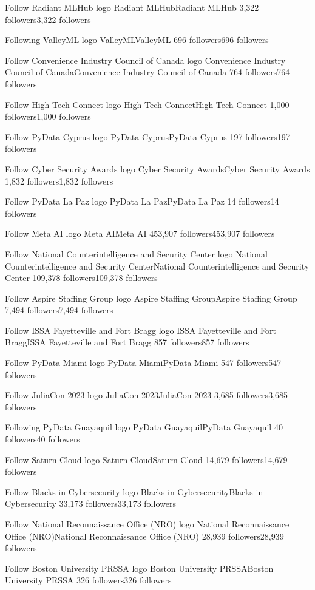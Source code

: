 Follow
Radiant MLHub logo
Radiant MLHubRadiant MLHub
3,322 followers3,322 followers

Following
ValleyML logo
ValleyMLValleyML
696 followers696 followers

Follow
Convenience Industry Council of Canada logo
Convenience Industry Council of CanadaConvenience Industry Council of Canada
764 followers764 followers

Follow
High Tech Connect logo
High Tech ConnectHigh Tech Connect
1,000 followers1,000 followers

Follow
PyData Cyprus logo
PyData CyprusPyData Cyprus
197 followers197 followers

Follow
Cyber Security Awards logo
Cyber Security AwardsCyber Security Awards
1,832 followers1,832 followers

Follow
PyData La Paz logo
PyData La PazPyData La Paz
14 followers14 followers

Follow
Meta AI logo
Meta AIMeta AI
453,907 followers453,907 followers

Follow
National Counterintelligence and Security Center logo
National Counterintelligence and Security CenterNational Counterintelligence and Security Center
109,378 followers109,378 followers

Follow
Aspire Staffing Group logo
Aspire Staffing GroupAspire Staffing Group
7,494 followers7,494 followers

Follow
ISSA Fayetteville and Fort Bragg logo
ISSA Fayetteville and Fort BraggISSA Fayetteville and Fort Bragg
857 followers857 followers

Follow
PyData Miami logo
PyData MiamiPyData Miami
547 followers547 followers

Follow
JuliaCon 2023 logo
JuliaCon 2023JuliaCon 2023
3,685 followers3,685 followers

Following
PyData Guayaquil logo
PyData GuayaquilPyData Guayaquil
40 followers40 followers

Follow
Saturn Cloud logo
Saturn CloudSaturn Cloud
14,679 followers14,679 followers

Follow
Blacks in Cybersecurity logo
Blacks in CybersecurityBlacks in Cybersecurity
33,173 followers33,173 followers

Follow
National Reconnaissance Office (NRO) logo
National Reconnaissance Office (NRO)National Reconnaissance Office (NRO)
28,939 followers28,939 followers

Follow
Boston University PRSSA logo
Boston University PRSSABoston University PRSSA
326 followers326 followers

